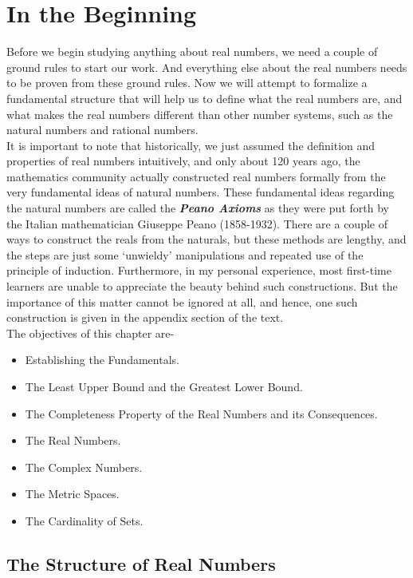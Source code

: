 \chapter{In the Beginning}
Before we begin studying anything about real numbers, we need a couple of ground rules to start our work. And everything else about the real numbers needs to be proven from these ground rules. Now we will attempt to formalize a fundamental structure that will help us to define what the real numbers are, and what makes the real numbers different than other number systems, such as the natural numbers and rational numbers.\\
It is important to note that historically, we just assumed the definition and properties of real numbers intuitively, and only about 120 years ago, the mathematics community actually constructed real numbers formally from the very fundamental ideas of natural numbers. These fundamental ideas regarding the natural numbers are called the \textbf{\textit{Peano Axioms}} as they were put forth by the Italian mathematician Giuseppe Peano (1858-1932). There are a couple of ways to construct the reals from the naturals, but these methods are lengthy, and the steps are just some `unwieldy' manipulations and repeated use of the principle of induction. Furthermore, in my personal experience, most first-time learners are unable to appreciate the beauty behind such constructions. But the importance of this matter cannot be ignored at all, and hence, one such construction is given in the appendix section of the text.\\
The objectives of this chapter are-
\begin{itemize}
    \item Establishing the Fundamentals.
    \item The Least Upper Bound and the Greatest Lower Bound.
    \item The Completeness Property of the Real Numbers and its Consequences.
    \item The Real Numbers.
    \item The Complex Numbers.
    \item The Metric Spaces.
    \item The Cardinality of Sets.
\end{itemize}
\newpage
\section{The Structure of Real Numbers}

